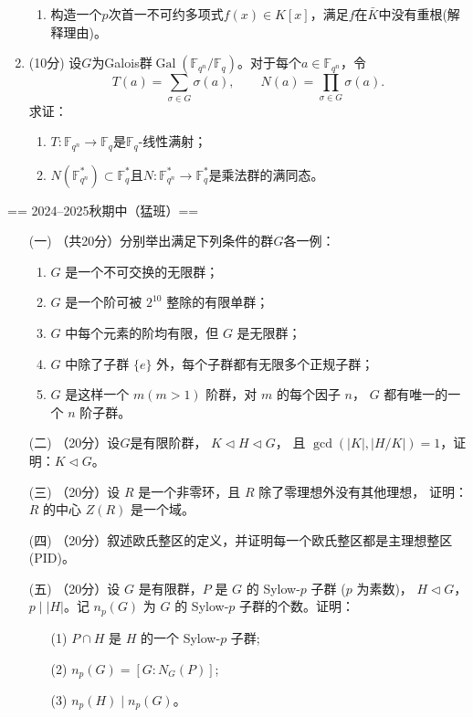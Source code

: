 \begin{enumerate}
\begin{enumerate}[label=(\arabic*)]
        \item 构造一个$p$次首一不可约多项式$f(x) \in K[x]$，满足$f$在$\bar{K}$中没有重根(解释理由)。
    \end{enumerate}
    \item (10分) 设$G$为Galois群$\operatorname{Gal}(\mathbb{F}_{q^n}/\mathbb{F}_q)$。对于每个$a\in\mathbb{F}_{q^n}$，令
    \[T(a)=\sum_{\sigma \in G}\sigma(a), \qquad N(a)=\prod_{\sigma \in G}\sigma(a).\]
    求证：
    \begin{enumerate}[label=(\arabic*)]
        \item $T:\mathbb{F}_{q^n}\to\mathbb{F}_q$是$\mathbb{F}_q$-线性满射；
        \item $N(\mathbb{F}^*_{q^n})\subset\mathbb{F}^*_q$且$N:\mathbb{F}^*_{q^n}\to\mathbb{F}^*_q$是乘法群的满同态。
    \end{enumerate}
\end{enumerate}

== 2024--2025秋期中（猛班）==
\begin{itemize}
    \item[(一)]（共20分）分别举出满足下列条件的群$G$各一例：
    \begin{enumerate}[label=(\arabic*)]
        \item $G$ 是一个不可交换的无限群；
        \item $G$ 是一个阶可被 $2^{10}$ 整除的有限单群；
        \item $G$ 中每个元素的阶均有限，但 $G$ 是无限群；
        \item $G$ 中除了子群 $\{e\}$ 外，每个子群都有无限多个正规子群；
        \item $G$ 是这样一个 $m(m > 1)$ 阶群，对 $m$ 的每个因子 $n$，
        $G$ 都有唯一的一个 $n$ 阶子群。
    \end{enumerate}
    \item[(二)]（20分）设$G$是有限阶群， $K\triangleleft H \triangleleft G$，
    且 $\gcd(|K|, |H/K|)=1$，证明：$K \triangleleft G$。
    \item[(三)]（20分）设 $R$ 是一个非零环，且 $R$ 除了零理想外没有其他理想，
    证明：$R$ 的中心 $Z(R)$ 是一个域。
    \item[(四)]（20分）叙述欧氏整区的定义，并证明每一个欧氏整区都是主理想整区(PID)。
    \item[(五)]（20分）设 $G$ 是有限群，$P$ 是 $G$ 的 Sylow-$p$ 子群 ($p$ 为素数)，
    $H \lhd G$，$p \mid |H|$。记 $n_p(G)$ 为 $G$ 的 Sylow-$p$ 子群的个数。证明：
    \begin{itemize}
        \item[(1)] $P \cap H$ 是 $H$ 的一个 Sylow-$p$ 子群;
        \item[(2)] $n_p(G) = [G : N_G(P)]$;
        \item[(3)] $n_p(H) \mid n_p(G)$。
    \end{itemize}
\end{itemize}


